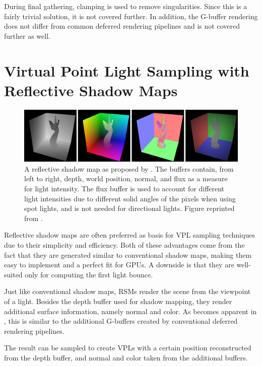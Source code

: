 During final gathering, clamping is used to remove singularities. Since this is a fairly trivial solution, it is not covered further.
In addition, the G-buffer rendering does not differ from common deferred rendering pipelines and is not covered further as well.


\section{Virtual Point Light Sampling with Reflective Shadow Maps}
\label{sec:concept:rsmVplSampling}

\begin{figure}[htb]
\centering
    \includegraphics[width=\textwidth]{graphics/rsm_dachsbacher}
  \caption{A reflective shadow map as proposed by \citet{Dachsbacher:2005:RSM}. The buffers contain, from left to right, depth, world position, normal, and flux as a measure for light intensity. The flux buffer is used to account for different light intensities due to different solid angles of the pixels when using spot lights, and is not needed for directional lights. Figure reprinted from \citet{Dachsbacher:2005:RSM}.}
  \label{fig:concept:rsm_dachsbacher}
\end{figure}

Reflective shadow maps are often preferred as basis for VPL sampling techniques due to their simplicity and efficiency. Both of these advantages come from the fact that they are generated similar to conventional shadow maps, making them easy to implement and a perfect fit for GPUs. A downside is that they are well-suited only for computing the first light bounce.

Just like conventional shadow maps, RSMs render the scene from the viewpoint of a light. Besides the depth buffer used for shadow mapping, they render additional surface information, namely normal and color. As becomes apparent in , this is similar to the additional G-buffers created by conventional deferred rendering pipelines.

The result can be sampled to create VPLs with a certain position reconstructed from the depth buffer, and normal and color taken from the additional buffers.

